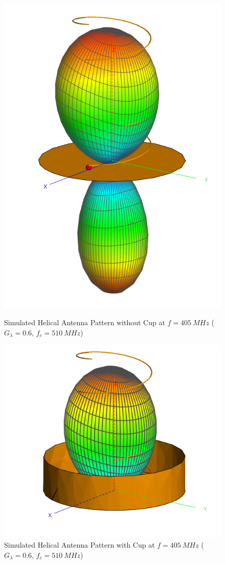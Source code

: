 \begin{figure}[!htb]
  \begin{minipage}{.49\textwidth}
    \centering
    \includegraphics[width=0.5\linewidth]{helix5_pattern_405MHz}
    \caption{Simulated Helical Antenna Pattern without Cup at $f=\SI{405}{MHz}$ ($G_\lambda = 0.6$, $f_c=\SI{510}{MHz}$)}
    \label{fig:helix5_pattern_405MHz}
  \end{minipage}
  \begin{minipage}{.49\textwidth}
    \centering
    \includegraphics[width=0.85\linewidth]{helix6_pattern_405MHz}
    \caption{Simulated Helical Antenna Pattern with Cup at $f=\SI{405}{MHz}$ ($G_\lambda = 0.6$, $f_c=\SI{510}{MHz}$)}
    \label{fig:helix6_pattern_405MHz}
  \end{minipage}
\end{figure}

